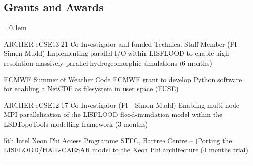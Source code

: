 \documentclass[10.5pt,a4]{article}
\makeatletter
\newcommand{\headerrow}[2]
{\begin{tabular*}{\linewidth}{l@{\extracolsep{\fill}}r}
	#1 &
	#2 \\
\end{tabular*}}
\makeatother
\begin{document}
\subsection*{Grants and Awards}
	\parskip=0.1em
\begin{itemize*}
	\item 
	  {ARCHER eCSE13-21 Co-Investigator and funded Technical Staff Member (PI - Simon Mudd)}
	  {Implementing parallel I/O within LISFLOOD to enable high-resolution massively parallel hydrogeomorphic simulations (6  months)}
	  
	\item 
	  {ECMWF Summer of Weather Code}
	  {ECMWF grant to develop Python software for enabling a NetCDF as filesystem in user space (FUSE)}

	\item 
	  {ARCHER eCSE12-17 Co-Investigator (PI - Simon Mudd)}
	  {Enabling multi-node MPI parallelisation of the LISFLOOD flood-inundation model within the LSDTopoTools modelling framework (3  months) }

	\item 
	  {5th Intel Xeon Phi Access Programme}
	  {STFC, Hartree Centre -- (Porting the LISFLOOD/HAIL-CAESAR model to the Xeon Phi architecture (4 months trial)}


\end{itemize*}

\hrule
\vspace{-0.4em}
\end{document}

